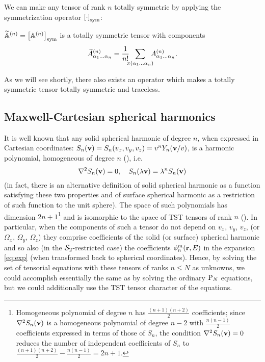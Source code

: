 We can make any tensor of rank $n$ totally symmetric by applying the symmetrization operator $\left[\cdot\right]_{\mbox{\scriptsize sym}}$:
\begin{definition}\label{def:symmetrization}
  $\widetilde{\mathbb{A}}^{(n)} = \left[\mathbb{A}^{(n)}\right]_{\mbox{\scriptsize sym}}$ is a totally symmetric tensor with components
  $$
    \widetilde A^{(n)}_{\alpha_1\ldots\alpha_n} = \frac{1}{n!}\ \; \sum_{\mathclap{\perm{\alpha_1\ldots\alpha_n}}}\ \;\AAA{\alpha_1\ldots\alpha_n}.
  $$
\end{definition}  
As we will see shortly, there also exists an operator which makes a totally symmetric tensor totally symmetric and traceless.

\subsection{Maxwell-Cartesian spherical harmonics}\label{sec:MCSH}
It is well known that any solid spherical harmonic of degree $n$, when expressed in Cartesian coordinates: $S_n(\mathbf{v}) =
S_n(v_x, v_y, v_z) = v^n Y_n(\mathbf{v}/v)$, is a harmonic polynomial, homogeneous of degree $n$ (\cite[Art. 110]{Byerly}),
i.e.
$$
  \nabla^2 S_n(\mathbf{v}) = 0,\quad S_n(\lambda\mathbf{v}) = \lambda^n S_n(\mathbf{v})
$$ (in fact, there is an alternative definition of solid spherical harmonic as a function satisfying these two
properties and of surface spherical harmonic as a restriction of such function to the unit sphere). The space of such
polynomials has dimension $2n + 1$\footnote{Homogeneous polynomial of degree $n$ has $\frac{(n+1)(n+2)}{2}$
coefficients; since $\nabla^2 S_n(\mathbf{v})$ is a homogeneous polynomial of degree $n-2$ with $\frac{n(n-1)}{2}$ coefficients
expressed in terms of those of $S_n$, the condition $\nabla^2 S_n(\mathbf{v}) = 0$ reduces the number of independent coefficients
of $S_n$ to $\frac{(n+1)(n+2)}{2} - \frac{n(n-1)}{2} = 2n + 1$.}\label{pg:indepc} and is isomorphic to the space of TST
tensors of rank $n$ (\cite{Sam}).
In particular, when the components of such a tensor do not depend on $v_x$, $v_y$, $v_z$, (or $\Omega_x$, $\Omega_y$,
$\Omega_z$) they comprise coefficients of the solid (or surface) spherical harmonic and so also (in the
$\mathcal{S}_2$-restricted case) the coefficients $\phi_{n}^{m}(\mathbf{r},E)$ in the expansion \eqref{eq:exp} (when transformed
back to spherical coordinates). Hence, by solving the set of tensorial equations with these tensors of ranks $n \leq N$
as unknowns, we could accomplish essentially the same as by solving the ordinary $\text{P}_{N}$ equations, but we could
additionally use the TST tensor character of the equations.


